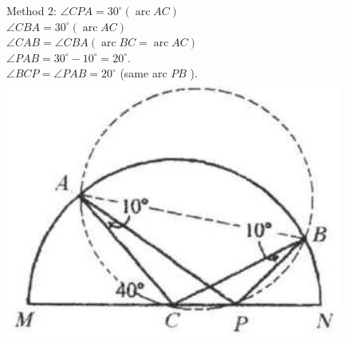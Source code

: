\documentclass{article}
\begin{document}
Method 2:
\(\angle C P A=30^{\circ}(\operatorname{arc} A C)\)\\
\(\angle C B A=30^{\circ}(\operatorname{arc} A C)\)\\
\(\angle C A B=\angle C B A(\operatorname{arc} B C=\operatorname{arc} A C)\)\\
\(\angle P A B=30^{\circ}-10^{\circ}=20^{\circ}\).\\
\(\angle B C P=\angle P A B=20^{\circ}\) (same arc \(P B\) ).\\
\centering
\includegraphics[width=\textwidth]{images/204(1).jpg}
\end{document}
